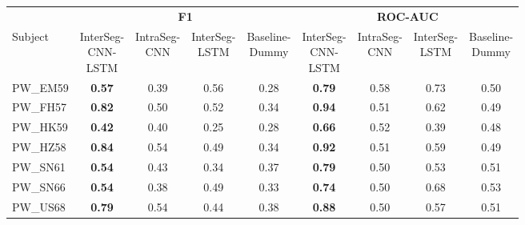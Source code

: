 \begingroup
\scriptsize
\setlength{\tabcolsep}{2pt}
\renewcommand{\arraystretch}{1.05}
\begin{tabular*}{\textwidth}{@{\extracolsep{\fill}}lcccccccc}
\toprule
 & \multicolumn{4}{c}{\textbf{F1}} & \multicolumn{4}{c}{\textbf{ROC-AUC}} \\
\cmidrule(lr){2-5}\cmidrule(lr){6-9}
Subject & \shortstack{InterSeg-\\CNN-\\LSTM} & \shortstack{IntraSeg-\\CNN} & \shortstack{InterSeg-\\LSTM} & \shortstack{Baseline-\\Dummy} & \shortstack{InterSeg-\\CNN-\\LSTM} & \shortstack{IntraSeg-\\CNN} & \shortstack{InterSeg-\\LSTM} & \shortstack{Baseline-\\Dummy} \\
\midrule
PW\_EM59 & \textbf{0.57} & 0.39 & 0.56 & 0.28 & \textbf{0.79} & 0.58 & 0.73 & 0.50 \\
PW\_FH57 & \textbf{0.82} & 0.50 & 0.52 & 0.34 & \textbf{0.94} & 0.51 & 0.62 & 0.49 \\
PW\_HK59 & \textbf{0.42} & 0.40 & 0.25 & 0.28 & \textbf{0.66} & 0.52 & 0.39 & 0.48 \\
PW\_HZ58 & \textbf{0.84} & 0.54 & 0.49 & 0.34 & \textbf{0.92} & 0.51 & 0.59 & 0.49 \\
PW\_SN61 & \textbf{0.54} & 0.43 & 0.34 & 0.37 & \textbf{0.79} & 0.50 & 0.53 & 0.51 \\
PW\_SN66 & \textbf{0.54} & 0.38 & 0.49 & 0.33 & \textbf{0.74} & 0.50 & 0.68 & 0.53 \\
PW\_US68 & \textbf{0.79} & 0.54 & 0.44 & 0.38 & \textbf{0.88} & 0.50 & 0.57 & 0.51 \\
\bottomrule
\end{tabular*}
\endgroup
